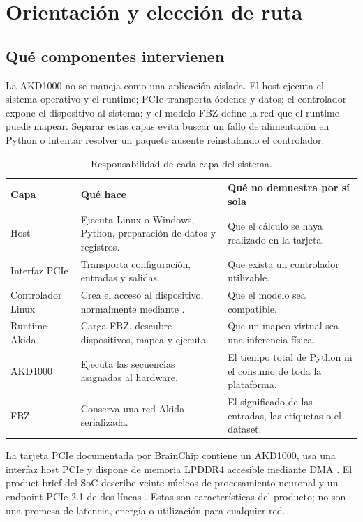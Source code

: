 \chapter{Orientación y elección de ruta}
\label{chap:orientacion}

\section{Qué componentes intervienen}

La AKD1000 no se maneja como una aplicación aislada. El host ejecuta el sistema operativo y el
runtime; PCIe transporta órdenes y datos; el controlador expone el dispositivo al sistema; y el
modelo FBZ define la red que el runtime puede mapear. Separar estas capas evita buscar un fallo
de alimentación en Python o intentar resolver un paquete ausente reinstalando el controlador.

\begin{table}[H]
\centering
\caption{Responsabilidad de cada capa del sistema.}
\label{tab:capas}
\begin{tabularx}{\textwidth}{@{}L{0.22\textwidth}YY@{}}
\toprule
\textbf{Capa} & \textbf{Qué hace} & \textbf{Qué no demuestra por sí sola} \\
\midrule
Host & Ejecuta Linux o Windows, Python, preparación de datos y registros. & Que el cálculo se haya realizado en la tarjeta. \\
Interfaz PCIe & Transporta configuración, entradas y salidas. & Que exista un controlador utilizable. \\
Controlador Linux & Crea el acceso al dispositivo, normalmente mediante . & Que el modelo sea compatible. \\
Runtime Akida & Carga FBZ, descubre dispositivos, mapea y ejecuta. & Que un mapeo virtual sea una inferencia física. \\
AKD1000 & Ejecuta las secuencias asignadas al hardware. & El tiempo total de Python ni el consumo de toda la plataforma. \\
FBZ & Conserva una red Akida serializada. & El significado de las entradas, las etiquetas o el dataset. \\
\bottomrule
\end{tabularx}
\end{table}

La tarjeta PCIe documentada por BrainChip contiene un AKD1000, usa una interfaz host PCIe y
dispone de memoria LPDDR4 accesible mediante DMA \cite{brainchip_card_brief}. El product brief
del SoC describe veinte núcleos de procesamiento neuronal y un endpoint PCIe 2.1 de dos líneas
\cite{brainchip_soc_brief}. Estas son características del producto; no son una promesa de
latencia, energía o utilización para cualquier red.

